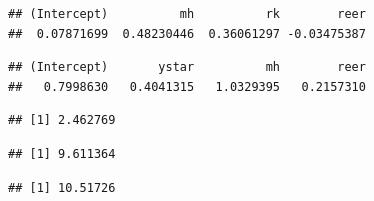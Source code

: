 \documentclass[]{article}
\newenvironment{Shaded}{\begin{snugshade}}{\end{snugshade}}
\newcommand{\DecValTok}[1]{\textcolor[rgb]{0.00,0.00,0.81}{#1}}
\newcommand{\OperatorTok}[1]{\textcolor[rgb]{0.81,0.36,0.00}{\textbf{#1}}}
\newcommand{\NormalTok}[1]{#1}
\begin{document}
\begin{verbatim}
## (Intercept)          mh          rk        reer 
##  0.07871699  0.48230446  0.36061297 -0.03475387
\end{verbatim}

\begin{Shaded}
\end{Shaded}

\begin{verbatim}
## (Intercept)       ystar          mh        reer 
##   0.7998630   0.4041315   1.0329395   0.2157310
\end{verbatim}

\begin{Shaded}
\end{Shaded}

\begin{verbatim}
## [1] 2.462769
\end{verbatim}

\begin{Shaded}
\end{Shaded}

\begin{verbatim}
## [1] 9.611364
\end{verbatim}

\begin{Shaded}
\end{Shaded}

\begin{verbatim}
## [1] 10.51726
\end{verbatim}

\begin{Shaded}
\end{Shaded}
\end{document}
